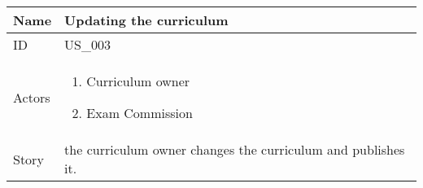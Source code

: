 \documentclass{article}
\newcommand\addrow[2]{#1 &#2\\ }
\newcommand\tabularhead{\begin{tabular}{lp{8cm}}
		\hline
	}
\newcommand\addmulrow[2]{ \begin{minipage}[t][][t]{2.5cm}#1\end{minipage}%
		&\begin{minipage}[t][][t]{8cm}
			\begin{enumerate} #2   \end{enumerate}
		\end{minipage}\\ }
\newenvironment{usecase}{\tabularhead}
	{\hline\end{tabular}}
\begin{document}
	\begin{usecase}
		\addrow{Name}{Updating the curriculum}
		\hline
		\addrow{ID}{US\_003}
		\hline
 		\addmulrow{Actors}{	\item Curriculum owner 
							\item Exam Commission}
		\hline		
		\addrow{Story}{the curriculum owner changes the curriculum and publishes it.}
								

	\end{usecase}
	
\end{document}
